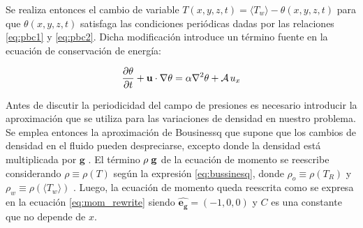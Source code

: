 


Se realiza entonces el cambio de variable $T(x,y,z,t) = \langle T_w \rangle - \theta(x,y,z,t)$ para que $\theta(x,y,z,t)$ satisfaga las condiciones periódicas dadas por las relaciones \ref{eq:pbc1} y \ref{eq:pbc2}. Dicha modificación introduce un término fuente en la ecuación de conservación de energía:

\begin{equation}
\frac{ \partial \theta }{ \partial t } + \mathbf{u} \cdot \nabla \theta = \alpha \nabla^2 \theta + \mathcal{A} \hspace{0.5mm} u_x 
\label{eq:energy_pcb_source}
\end{equation}

Antes de discutir la periodicidad del campo de presiones es necesario introducir la aproximación que se utiliza para las variaciones de densidad en nuestro problema. Se emplea entonces la aproximación de Bousinessq que supone que los cambios de densidad en el fluido pueden despreciarse, excepto donde la densidad está multiplicada por $\mathbf{g}$ \cite{kundu}. El término $\rho \hspace{1mm} \mathbf{g}$ de la ecuación de momento se reescribe considerando $\rho \equiv \rho(T)$ según la expresión \ref{eq:bussinesq}, donde $\rho_o \equiv \rho(T_R)$ y $\rho_w \equiv \rho(\langle T_w \rangle)$ \cite{incropera}. Luego, la ecuación de momento queda reescrita como se expresa en la ecuación \ref{eq:mom_rewrite} siendo $\mathbf{\hat{e_g}}=(-1,0,0)$ y $C$ es una constante que no depende de $x$.


